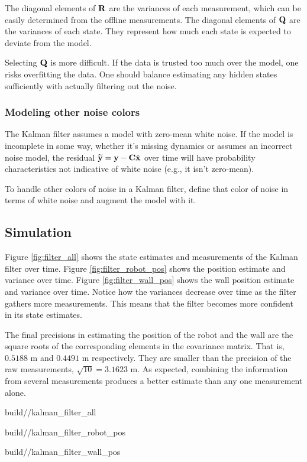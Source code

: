 The diagonal elements of $\mathbf{R}$ are the variances of each measurement, which
can be easily determined from the offline measurements. The diagonal elements of
$\mathbf{Q}$ are the variances of each \gls{state}. They represent how much each
\gls{state} is expected to deviate from the \gls{model}.

Selecting $\mathbf{Q}$ is more difficult. If the data is trusted too much over the
model, one risks overfitting the data. One should balance estimating any hidden
\glspl{state} sufficiently with actually filtering out the noise.

\subsubsection{Modeling other noise colors}

The Kalman filter assumes a \gls{model} with zero-mean white noise. If the
\gls{model} is incomplete in some way, whether it's missing dynamics or assumes
an incorrect noise \gls{model}, the residual
$\widetilde{\mathbf{y}} = \mathbf{y} - \mathbf{C}\hat{\mathbf{x}}$ over time will have
probability characteristics not indicative of white noise (e.g., it isn't
zero-mean).

To handle other colors of noise in a Kalman filter, define that color of noise
in terms of white noise and augment the \gls{model} with it.

\subsection{Simulation}
\label{subsec:filter_simulation}

Figure \ref{fig:filter_all} shows the \gls{state} estimates and measurements of
the Kalman filter over time. Figure \ref{fig:filter_robot_pos} shows the
position estimate and variance over time. Figure \ref{fig:filter_wall_pos} shows
the wall position estimate and variance over time. Notice how the variances
decrease over time as the filter gathers more measurements. This means that the
filter becomes more confident in its \gls{state} estimates.

The final precisions in estimating the position of the robot and the wall are
the square roots of the corresponding elements in the covariance matrix. That
is, $0.5188$ m and $0.4491$ m respectively. They are smaller than the precision
of the raw measurements, $\sqrt{10} = 3.1623$ m. As expected, combining the
information from several measurements produces a better estimate than any one
measurement alone.
\begin{svg}{build/\chapterpath/kalman_filter_all}
  \caption{State estimates and measurements with Kalman filter}
  \label{fig:filter_all}
\end{svg}
\begin{svg}{build/\chapterpath/kalman_filter_robot_pos}
  \caption{Robot position estimate and variance with Kalman filter}
  \label{fig:filter_robot_pos}
\end{svg}
\begin{svg}{build/\chapterpath/kalman_filter_wall_pos}
  \caption{Wall position estimate and variance with Kalman filter}
  \label{fig:filter_wall_pos}
\end{svg}

